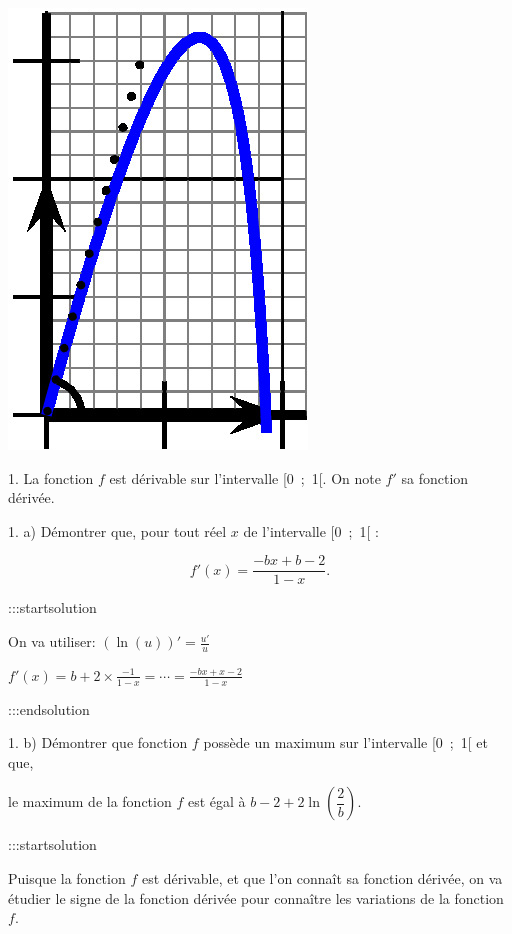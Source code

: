 \documentclass{cornouaille}
\begin{document}
\includegraphics{./TS-Complexes-Loga-2}









1.  La fonction $f$ est dérivable sur l'intervalle [0~;~1[. On note $f'$ sa fonction dérivée.




1. a)  Démontrer que, pour tout réel
$x$ de l'intervalle [0~;~1[ :


$$
f'(x) = \dfrac{- bx + b - 2}{1 - x}.
$$



:::startsolution

On va utiliser: $\left(\ln (u) \right) ' = \frac{u'}{u}$

$f'(x) = b + 2\times \frac{-1}{1-x} = \cdots = \frac{-bx+x-2}{1-x}$


:::endsolution


1. b)  Démontrer que fonction $f$ possède un maximum sur l'intervalle [0~;~1[ et que,

le maximum de la fonction $f$ est égal à $b - 2 + 2\ln \left(\dfrac{2}{b}\right)$.


:::startsolution

Puisque la fonction $f$ est dérivable, et que l'on connaît sa fonction dérivée, on va étudier le signe de la fonction dérivée pour connaître les variations de la fonction $f$.
\end{document}
